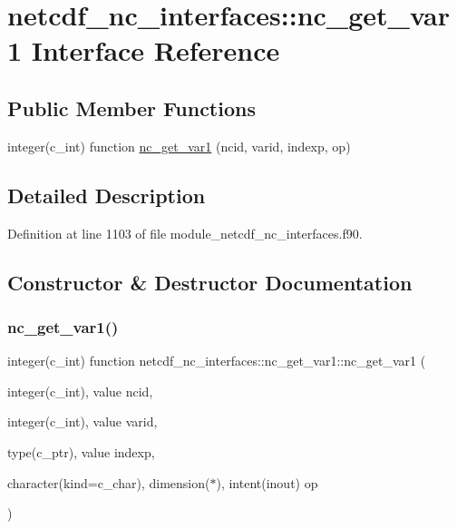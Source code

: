 \hypertarget{interfacenetcdf__nc__interfaces_1_1nc__get__var1}{}\section{netcdf\+\_\+nc\+\_\+interfaces\+:\+:nc\+\_\+get\+\_\+var1 Interface Reference}
\label{interfacenetcdf__nc__interfaces_1_1nc__get__var1}
\subsection*{Public Member Functions}
\begin{DoxyCompactItemize}
\item 
integer(c\+\_\+int) function \hyperlink{interfacenetcdf__nc__interfaces_1_1nc__get__var1_a2b5dca29d313a8bfa245729eb13880c7}{nc\+\_\+get\+\_\+var1} (ncid, varid, indexp, op)
\end{DoxyCompactItemize}


\subsection{Detailed Description}


Definition at line 1103 of file module\+\_\+netcdf\+\_\+nc\+\_\+interfaces.\+f90.



\subsection{Constructor \& Destructor Documentation}
\mbox{\label{interfacenetcdf__nc__interfaces_1_1nc__get__var1_a2b5dca29d313a8bfa245729eb13880c7}} 
\subsubsection{\texorpdfstring{nc\+\_\+get\+\_\+var1()}{nc\_get\_var1()}}
{\footnotesize\ttfamily integer(c\+\_\+int) function netcdf\+\_\+nc\+\_\+interfaces\+::nc\+\_\+get\+\_\+var1\+::nc\+\_\+get\+\_\+var1 (\begin{DoxyParamCaption}\item[{integer(c\+\_\+int), value}]{ncid,  }\item[{integer(c\+\_\+int), value}]{varid,  }\item[{type(c\+\_\+ptr), value}]{indexp,  }\item[{character(kind=c\+\_\+char), dimension($\ast$), intent(inout)}]{op }\end{DoxyParamCaption})}



